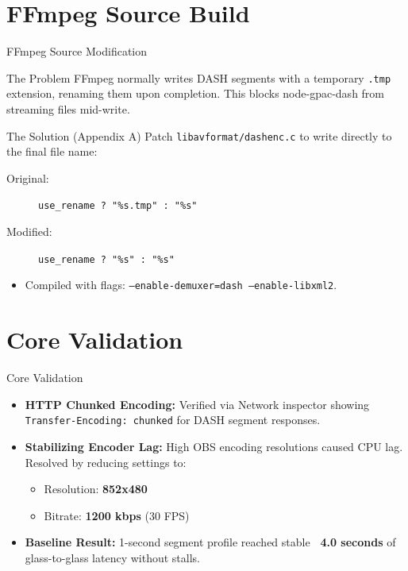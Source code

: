 \documentclass{beamer}
\begin{document}
\section{FFmpeg Source Build}

\begin{frame}{FFmpeg Source Modification}
    \begin{block}{The Problem}
        FFmpeg normally writes DASH segments with a temporary \texttt{.tmp} extension, renaming them upon completion. This blocks node-gpac-dash from streaming files mid-write.
    \end{block}
    \vspace{0.2cm}
    \begin{block}{The Solution (Appendix A)}
        Patch \texttt{libavformat/dashenc.c} to write directly to the final file name:
        \vspace{0.1cm}
        \small
        \begin{description}
            \item[Original:] \texttt{use\_rename ? "\%s.tmp" : "\%s"}
            \item[Modified:] \texttt{use\_rename ? "\%s" : "\%s"}
        \end{description}
    \end{block}
    \vspace{0.1cm}
    \begin{itemize}
        \item Compiled with flags: \texttt{--enable-demuxer=dash --enable-libxml2}.
    \end{itemize}
\end{frame}

\section{Core Validation}

\begin{frame}{Core Validation}
    \begin{itemize}
        \item \textbf{HTTP Chunked Encoding:} Verified via Network inspector showing \texttt{Transfer-Encoding: chunked} for DASH segment responses.
        \item \textbf{Stabilizing Encoder Lag:} High OBS encoding resolutions caused CPU lag. Resolved by reducing settings to:
        \begin{itemize}
            \item Resolution: \textbf{852x480}
            \item Bitrate: \textbf{1200 kbps} (30 FPS)
        \end{itemize}
        \item \textbf{Baseline Result:} 1-second segment profile reached stable \textbf{~4.0 seconds} of glass-to-glass latency without stalls.
    \end{itemize}
\end{frame}
\end{document}
